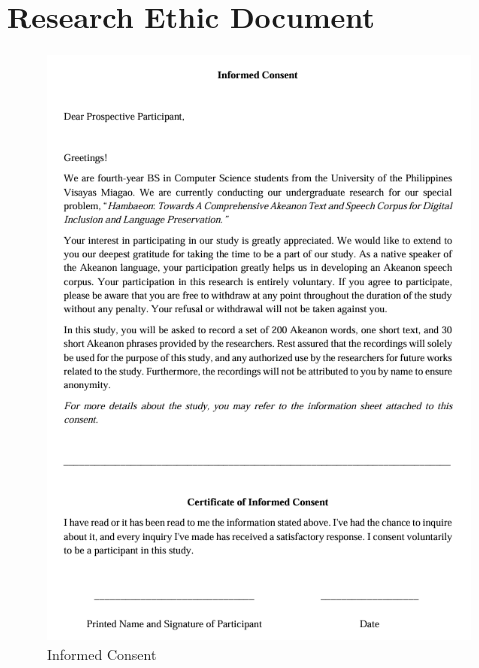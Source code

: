 %
%
%                 
\chapter{Research Ethic Document}
\label{sec:appendixa}

\begin{figure}[h!]
	\centering
	\includegraphics[width=\textwidth]{./appendix/informed_consent.png}
	\caption{Informed Consent}
	\label{fig:informedConsent}
\end{figure}

